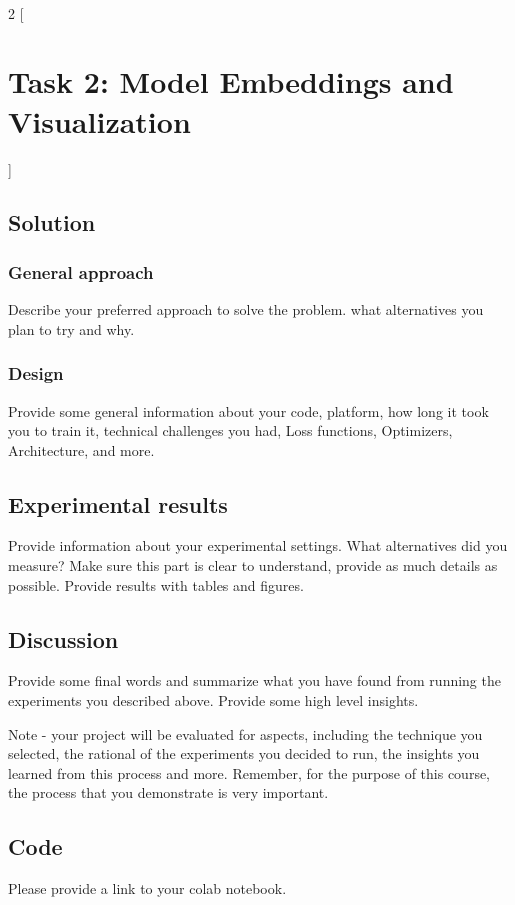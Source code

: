 \documentclass{article}
\begin{document}
\
\begin{multicols}{2}
[
\section{\centering Task 2: Model Embeddings and Visualization}
]
\subsection{Solution}
\subsubsection{General approach}
Describe your preferred approach to solve the problem. what alternatives you plan to try and why. 

\subsubsection{Design}
Provide some general information about your code, platform, how long it took you to train it, technical challenges you had, Loss functions, Optimizers, Architecture, and more.

\subsection{Experimental results}
Provide information about your experimental settings. What alternatives did you measure? Make sure this part is clear to understand, provide as much details as possible. Provide results with tables and figures.

\subsection{Discussion}
Provide some final words and summarize what you have found from running the experiments you described above. Provide some high level insights.

Note - your project will be evaluated for aspects, including the technique you selected, the rational of the experiments you decided to run, the insights you learned from this process and more. Remember, for the purpose of this course, the process that you demonstrate is very  important.

\subsection{Code}

Please provide a link to your colab notebook.

\end{multicols}
\end{document}
